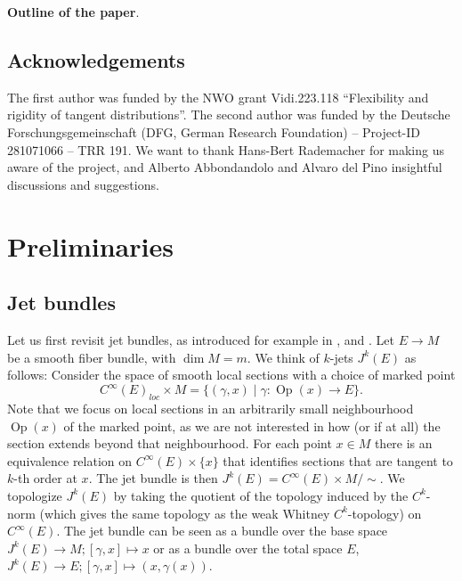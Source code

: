 \documentclass{amsart}
\newcommand{\Op}{\operatorname{Op}}
\theoremstyle{definition}
\theoremstyle{remark}
\numberwithin{equation}{section}
\newcommand{\bparagraph}[1]{\vspace{1em}\noindent\textbf{#1}.\hspace{0.2cm}}
\begin{document}
\bparagraph{Outline of the paper} 

\subsection*{Acknowledgements} The first author was funded by the NWO grant Vidi.223.118 “Flexibility and rigidity of tangent distributions”. The second author was funded by the Deutsche Forschungsgemeinschaft (DFG, German Research Foundation) – Project-ID 281071066 – TRR 191. We want to thank Hans-Bert Rademacher for making us aware of the project, and Alberto Abbondandolo and Alvaro del Pino insightful discussions and suggestions. 





\section{Preliminaries}


\subsection{Jet bundles}
Let us first revisit jet bundles, as introduced for example in \cite[Chapter 1]{EM02}, \cite[Chapter 1.1]{Gr10} and \cite[Chapter II]{GG73}. Let $E\to M$ be a smooth fiber bundle, with $\dim M=m$. We think of $k$-jets $J^k(E)$ as follows: Consider the space of smooth local sections with a choice of marked point $$C^\infty(E)_{loc}\times M=\{(\gamma,x)\mid \gamma:\Op(x)\to E\}.$$ Note that we focus on local sections in an arbitrarily small neighbourhood $\Op(x)$ of the marked point, as we are not interested in how (or if at all) the section extends beyond that neighbourhood. For each point $x\in M$ there is an equivalence relation on $C^\infty(E)\times\{x\}$ that identifies sections that are tangent to $k$-th order at $x$. The jet bundle is then $J^k(E)=C^\infty(E)\times M/\sim$. We topologize $J^k(E)$ by taking the quotient of the topology induced by the $C^k$-norm (which gives the same topology as the weak Whitney $C^k$-topology) on $C^\infty(E)$. The jet bundle can be seen as a bundle over the base space $J^k(E)\to M;[\gamma,x]\mapsto x$ or as a bundle over the total space $E$, $J^k(E)\to E;[\gamma,x]\mapsto (x,\gamma(x))$. 
\end{document}

